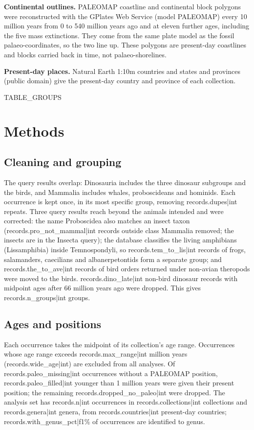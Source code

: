 \documentclass[11pt,a4paper]{article}
\begin{document}
\textbf{Continental outlines.} PALEOMAP coastline and continental block polygons \citep{scotese2016,scotese2018} were reconstructed with the GPlates Web Service (model PALEOMAP) every 10 million years from 0 to 540 million years ago and at eleven further ages, including the five mass extinctions. They come from the same plate model as the fossil palaeo-coordinates, so the two line up. These polygons are present-day coastlines and blocks carried back in time, not palaeo-shorelines.

\textbf{Present-day places.} Natural Earth 1:10m countries and states and provinces (public domain) give the present-day country and province of each collection.

{{TABLE_GROUPS}}

\section{Methods}
\subsection{Cleaning and grouping}
The query results overlap: Dinosauria includes the three dinosaur subgroups and the birds, and Mammalia includes whales, proboscideans and hominids. Each occurrence is kept once, in its most specific group, removing {{records.dupes|int}} repeats. Three query results reach beyond the animals intended and were corrected: the name Proboscidea also matches an insect taxon ({{records.pro_not_mammal|int}} records outside class Mammalia removed; the insects are in the Insecta query); the database classifies the living amphibians (Lissamphibia) inside Temnospondyli, so {{records.tem_to_lis|int}} records of frogs, salamanders, caecilians and albanerpetontids form a separate group; and {{records.the_to_ave|int}} records of bird orders returned under non-avian theropods were moved to the birds. {{records.dino_late|int}} non-bird dinosaur records with midpoint ages after 66 million years ago were dropped. This gives {{records.n_groups|int}} groups.

\subsection{Ages and positions}
Each occurrence takes the midpoint of its collection's age range. Occurrences whose age range exceeds {{records.max_range|int}} million years ({{records.wide_age|int}}) are excluded from all analyses. Of {{records.paleo_missing|int}} occurrences without a PALEOMAP position, {{records.paleo_filled|int}} younger than 1 million years were given their present position; the remaining {{records.dropped_no_paleo|int}} were dropped. The analysis set has {{records.n|int}} occurrences in {{records.collections|int}} collections and {{records.genera|int}} genera, from {{records.countries|int}} present-day countries; {{records.with_genus_pct|f1}}\% of occurrences are identified to genus.
\end{document}
